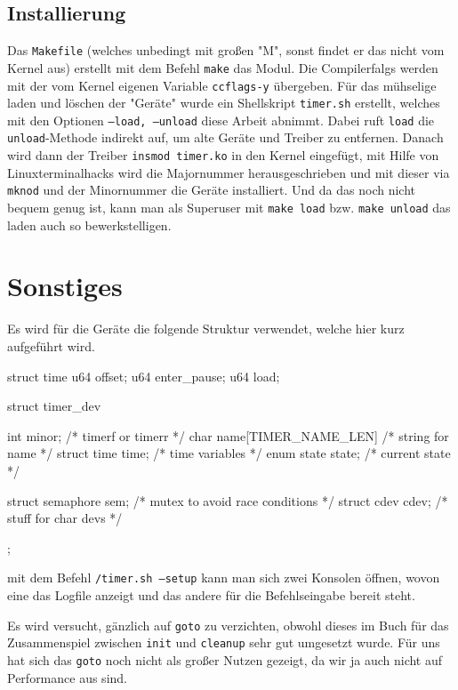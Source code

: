 \documentclass[
   draft=false
  ,paper=a4
  ,twoside=false
  ,fontsize=11pt
  ,headsepline
  ,BCOR10mm
  ,DIV11
  ,parskip=full+
]{scrartcl} %
\begin{document}
\subsection{Installierung}
Das \texttt{Makefile} (welches unbedingt mit großen "{}M"{}, sonst findet er
das nicht vom Kernel aus) erstellt mit dem Befehl \texttt{make} das Modul. Die
Compilerfalgs werden mit der vom Kernel eigenen Variable \texttt{ccflags-y}
übergeben.
Für das mühselige laden und löschen der "{}Geräte"{} wurde ein
Shellskript \texttt{timer.sh} erstellt, welches mit den Optionen
\texttt{--load, --unload} diese Arbeit abnimmt. Dabei ruft \texttt{load} die
\texttt{unload}-Methode indirekt auf, um alte Geräte und Treiber zu entfernen.
Danach wird dann der Treiber \texttt{insmod timer.ko} in den Kernel eingefügt,
mit Hilfe von Linuxterminalhacks wird die Majornummer herausgeschrieben und
mit dieser via \texttt{mknod} und der Minornummer die Geräte installiert.
Und da das noch nicht bequem genug ist, kann man als Superuser mit
\texttt{make load} bzw. \texttt{make unload} das laden auch so bewerkstelligen.

\section{Sonstiges}

Es wird für die Geräte die folgende Struktur verwendet, welche hier kurz
aufgeführt wird.
\begin{ccode}
struct time {
    u64 offset;
    u64 enter_pause;
    u64 load;
}

struct timer_dev {
    int minor;              /* timerf or timerr */
    char name[TIMER_NAME_LEN]  /* string for name */
    struct time time;       /* time variables */
    enum state state; /* current state */

    struct semaphore sem;   /* mutex to avoid race conditions */
    struct cdev cdev;       /* stuff for char devs */
};

\end{ccode}
mit dem Befehl \texttt{/timer.sh --setup} kann man sich zwei Konsolen öffnen,
wovon eine das Logfile anzeigt und das andere für die Befehlseingabe bereit
steht.

Es wird versucht, gänzlich auf \texttt{goto} zu verzichten, obwohl dieses im
Buch für das Zusammenspiel zwischen \texttt{init} und \texttt{cleanup} sehr
gut umgesetzt wurde. Für uns hat sich das \texttt{goto} noch nicht als großer
Nutzen gezeigt, da wir ja auch nicht auf Performance aus sind.
\end{document}

